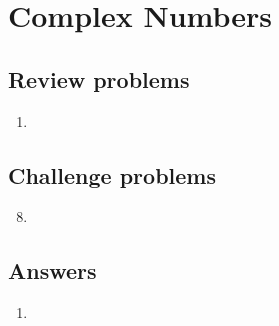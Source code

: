 \section{Complex Numbers}

\subsection{Review problems}

\begin{enumerate}
\item 
\end{enumerate}


\subsection{Challenge problems}

\begin{enumerate}\setcounter{enumi}{7}
\item 
\end{enumerate}


\newpage
\subsection{Answers}

\begin{enumerate}
\item 
\end{enumerate}